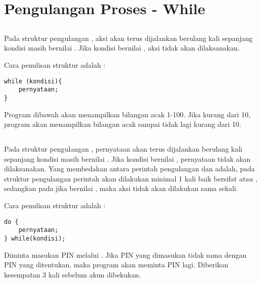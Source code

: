 \documentclass[../main.tex]{subfiles}
\begin{document}
\chapter{Pengulangan Proses - While}
\section{}
Pada struktur pengulangan , aksi akan terus dijalankan berulang kali sepanjang kondisi  masih bernilai . Jika kondisi  bernilai , aksi tidak akan dilaksanakan.

Cara penulisan struktur  adalah :

\begin{verbatim}
while (kondisi){
	pernyataan;
}
\end{verbatim}

Program dibawah akan menampilkan bilangan acak 1-100. Jika  kurang dari 10, program akan menampilkan bilangan acak sampai  tidak lagi kurang dari 10.


\section{}
Pada struktur pengulangan , pernyataan akan terus dijalankan berulang kali sepanjang kondisi  masih bernilai . Jika kondisi  bernilai , pernyataan tidak akan dilaksanakan. Yang membedakan antara perintah pengulangan  dan  adalah, pada struktur pengulangan  perintah akan dilakukan minimal 1 kali baik  bersifat  atau , sedangkan pada  jika  bernilai , maka aksi tidak akan dilakukan sama sekali.

Cara penulisan struktur  adalah :

\begin{verbatim}
do {
	pernyataan;
} while(kondisi);
\end{verbatim}

Diminta masukan PIN melalui . Jika PIN yang dimasukan tidak sama dengan PIN yang ditentukan, maka program akan meminta PIN lagi. Diberikan kesempatan 3 kali sebelum akun dibekukan.

\end{document}
